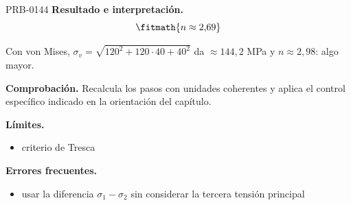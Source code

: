 \begin{studiumworked}{PRB-0144}
\textbf{Resultado e interpretación.}\[\fitmath{n \approx 2{,}69}\]

Con von Mises, $\sigma_v = \sqrt{120^2 + 120\cdot 40 + 40^2}$ da $\approx 144{,}2$ MPa y $n \approx 2{,}98$: algo mayor.

\par\textbf{Comprobación.} Recalcula los pasos con unidades coherentes y aplica el control específico indicado en la orientación del capítulo.

\textbf{Límites.}\begin{itemize}\item criterio de Tresca\end{itemize}

\textbf{Errores frecuentes.}\begin{itemize}\item usar la diferencia $\sigma_1 - \sigma_2$ sin considerar la tercera tensión principal\end{itemize}

\end{studiumworked}

\Needspace{.3\textheight}

